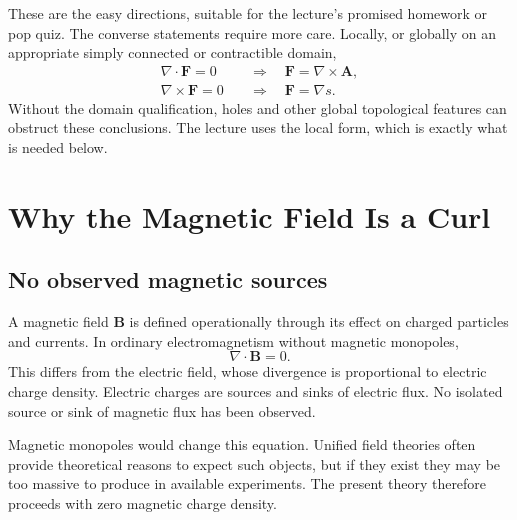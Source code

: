 These are the easy directions, suitable for the lecture's promised homework or pop quiz. The converse statements require more care. Locally, or globally on an appropriate simply connected or contractible domain,
\begin{align}
  \nabla\cdot\mathbf F=0
  &\quad\Longrightarrow\quad
  \mathbf F=\nabla\times\mathbf A,\\
  \nabla\times\mathbf F=0
  &\quad\Longrightarrow\quad
  \mathbf F=\nabla s.
\end{align}
Without the domain qualification, holes and other global topological features can obstruct these conclusions. The lecture uses the local form, which is exactly what is needed below.

\section{Why the Magnetic Field Is a Curl}

\subsection{No observed magnetic sources}

A magnetic field \(\mathbf B\) is defined operationally through its effect on charged particles and currents. In ordinary electromagnetism without magnetic monopoles,
\begin{equation}
  \nabla\cdot\mathbf B=0.
\end{equation}
This differs from the electric field, whose divergence is proportional to electric charge density. Electric charges are sources and sinks of electric flux. No isolated source or sink of magnetic flux has been observed.

Magnetic monopoles would change this equation. Unified field theories often provide theoretical reasons to expect such objects, but if they exist they may be too massive to produce in available experiments. The present theory therefore proceeds with zero magnetic charge density.

\begin{classroomqa}
\end{classroomqa}

